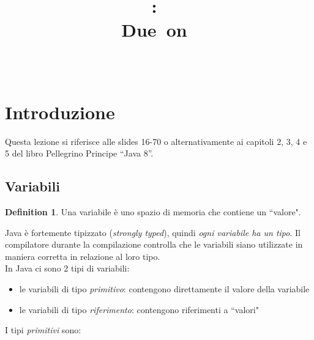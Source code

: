 \documentclass{article}
\title{
\vspace{2in}
\textmd{\textbf{\hmwkClass:\ \hmwkTitle}}\\
\normalsize\vspace{0.1in}\small{Due\ on\ \hmwkDueDate}\\
\vspace{0.1in}\large{\textit{\hmwkClassInstructor\ \hmwkClassTime}}
\vspace{3in}
}
\author{\textbf{\hmwkAuthorName}}
\date{} %
\begin{document}
\maketitle



\newpage
\tableofcontents
\newpage

\theoremstyle{definition} 

\newtheorem{mydef}{Definition}
\newtheorem{lemma}{Lemma}

\newtheorem{theorem}{Theorem}[section]


\section{Introduzione}
Questa lezione si riferisce alle slides 16-70  o alternativamente ai capitoli 2, 3, 4 e 5 del libro  Pellegrino Principe ``Java 8''.

\subsection{Variabili}
\begin{mydef} Una variabile è uno spazio di memoria che contiene un ``valore". 
\end{mydef}
Java è fortemente tipizzato (\emph{strongly typed}), quindi \emph{ogni variabile ha un tipo}. Il compilatore durante la compilazione controlla che le variabili siano utilizzate in maniera corretta in relazione al loro tipo.\\

In Java ci sono 2 tipi di variabili:
\begin{itemize}
\item le variabili di tipo \emph{primitivo}: contengono direttamente il valore della variabile
\item le variabili di tipo \emph{riferimento}: contengono riferimenti a ``valori" 
\end{itemize}

I tipi \emph{primitivi} sono:
\end{document}
